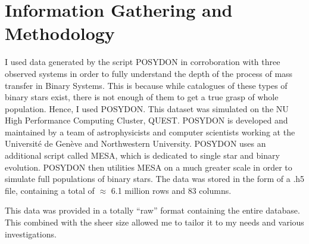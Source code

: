 \documentclass[12pt, a4paper]{article}
\begin{document}
\section{Information Gathering and Methodology}

    I used data generated by the script POSYDON in corroboration with three observed systems in order to fully understand the depth of the process of mass transfer in Binary Systems. This is because while catalogues of these types of binary stars exist, there is not enough of them to get a true grasp of whole population. Hence, I used POSYDON. This dataset was simulated on the NU High Performance Computing Cluster, QUEST. POSYDON is developed and maintained by a team of astrophysicists and computer scientists working at the Université de Genève and Northwestern University. POSYDON uses an additional script called MESA, which is dedicated to single star and binary evolution. POSYDON then utilities MESA on a much greater scale in order to simulate full populations of binary stars. The data was stored in the form of a .h5 file, containing a total of $\approx$ 6.1 million rows and 83 columns.

    This data was provided in a totally ``raw'' format containing the entire database. This combined with the sheer size allowed me to tailor it to my needs and various investigations.  
\end{document}
